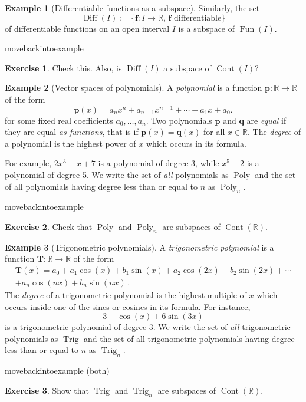 \documentclass[a4paper,11pt]{book}
\theoremstyle{definition}
\newtheorem{exercise}{Exercise}
\newtheorem{example_environment}{Example}[chapter]
\newcommand{\be}{\begin{equation}}
\newcommand{\ee}{\end{equation}}
\newcommand{\ve}[1]{\mathbf{#1}}
\newenvironment{example}
	{
		\begin{oframed} 
		\begin{example_environment}
	}
	{
		\end{example_environment}
		\end{oframed}
	}
\DeclareMathOperator{\Fun}{Fun}
\DeclareMathOperator{\Cont}{Cont}
\DeclareMathOperator{\Diff}{Diff}
\DeclareMathOperator{\Poly}{Poly}
\DeclareMathOperator{\Trig}{Trig}
\begin{document}
\begin{example}[Differentiable functions as a subspace] Similarly, the set
\[
 \Diff(I) := \{ \ve{f}: I \rightarrow \mathbb{R}, \, \ve{f} \mbox{ differentiable} \}
 \]
of differentiable functions on an open interval $I$ is a subspace of $\Fun (I)$. 

\end{example}
movebackintoexample
\begin{exercise} Check this. Also, is $\Diff( I)$ a subspace of $\Cont(I)$?
\end{exercise}
\begin{example}[Vector spaces of polynomials]
 A {\em polynomial} is a function $\ve{p} : \mathbb{R} \rightarrow \mathbb{R}$ of the form
\be
 \ve{p}(x) = a_n x^n + a_{n-1}x^{n-1} + \cdots + a_1 x + a_0. \label{formula_poly}
\ee
for some fixed real coefficients $a_0, \ldots, a_n$. Two polynomials $\ve{p}$ and $\ve{q}$ are {\em equal} if they are equal {\em as functions}, that is if $\ve{p}(x) = \ve{q} (x)$ for all $x \in \mathbb{R}$. The {\em degree} of a polynomial is the highest power of $x$ which occurs in its formula.

For example, $2x^3 - x + 7$ is a polynomial of degree 3, while $x^5 - 2$ is a polynomial of degree 5. 
 We write the set of {\em all} polynomials as $\Poly$ and the set of all polynomials having degree less than or equal to $n$ as $\Poly_n$.


\end{example} 
movebackintoexample
\begin{exercise} Check that $\Poly$ and $\Poly_n$ are subspaces of $\Cont (\mathbb{R})$.
\end{exercise}
\begin{example}[Trigonometric polynomials] \label{trig_poly_example} A {\em trigonometric polynomial} is a function $\ve{T} : \mathbb{R} \rightarrow \mathbb{R}$ of the form
\begin{multline} \label{formula_for_trig_poly}
 \ve{T} (x) = a_0 + a_1 \cos(x) + b_1 \sin(x) + a_2 \cos(2x) + b_2 \sin(2x) + \cdots \\ + a_n \cos(nx) + b_n \sin(nx) \, .
\end{multline}
The {\em degree} of a trigonometric polynomial is the highest multiple of $x$ which occurs inside one of the sines or cosines in its formula. For instance,
\[
 3 - \cos(x) + 6 \sin(3x)
\] 
is a trigonometric polynomial of degree 3. We write the set of {\em all} trigonometric polynomials as $\Trig$ and the set of all trigonometric polynomials having degree less than or equal to $n$ as $\Trig_n$. 


\end{example}
movebackintoexample (both)
\begin{exercise} Show that $\Trig$ and $\Trig_n$ are subspaces of $\Cont (\mathbb{R})$.
\end{exercise}
\end{document}
